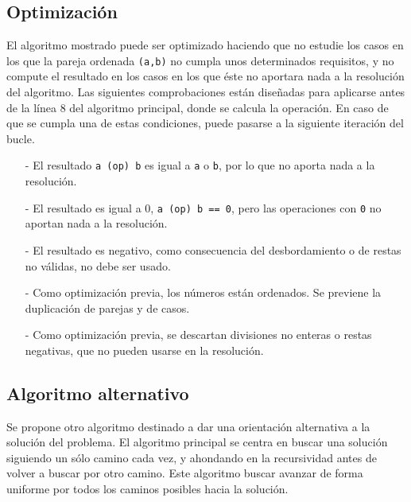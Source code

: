 \documentclass[a4paper,10pt]{scrartcl}
\def\C++#1{\texttt{#1}}
\begin{document}
   \subsection{Optimización}
   El algoritmo mostrado puede ser optimizado haciendo que no estudie los casos en los que la pareja ordenada \C++{(a,b)} no cumpla unos
   determinados requisitos, y no compute el resultado en los casos en los que éste no aportara nada a la resolución del algoritmo. Las
   siguientes comprobaciones están diseñadas para aplicarse antes de la línea 8 del algoritmo principal, donde se calcula la operación. 
   En caso de que se cumpla una de estas condiciones, puede pasarse a la siguiente iteración del bucle.\\
   \begin{itemize}
    \item [-] El resultado \C++{a (op) b} es igual a \C++{a} o \C++{b}, por lo que no aporta nada a la resolución.
    \item [-] El resultado es igual a 0, \C++{a (op) b == 0}, pero las operaciones con \C++{0} no aportan nada a la resolución.
    \item [-] El resultado es negativo, como consecuencia del desbordamiento o de restas no válidas, no debe ser usado.
    \item [-] Como optimización previa, los números están ordenados. Se previene la duplicación de parejas y de casos.
    \item [-] Como optimización previa, se descartan divisiones no enteras o restas negativas, que no pueden usarse en la resolución.
   \end{itemize}

   
   \subsection{Algoritmo alternativo}
   Se propone otro algoritmo destinado a dar una orientación alternativa a la solución del problema. El algoritmo principal se centra
   en buscar una solución siguiendo un sólo camino cada vez, y ahondando en la recursividad antes de volver a buscar por otro camino.
   Este algoritmo buscar avanzar de forma uniforme por todos los caminos posibles hacia la solución.
   
\end{document}
